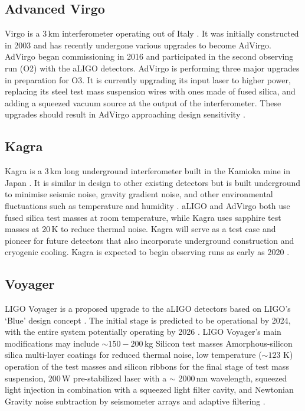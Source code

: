 \documentclass[letterpaper, aps, prd, twocolumn, superscriptaddress, showpacs, nofootinbib]{revtex4}
\begin{document}
\subsection{Advanced Virgo}

Virgo is a 3\,km interferometer operating out of Italy \cite{AdVirgo}. It was initially constructed in 2003 and has recently undergone various upgrades to become AdVirgo. AdVirgo began commissioning in 2016 and participated in the second observing run (O2) with the aLIGO detectors. AdVirgo is performing three major upgrades in preparation for O3. It is currently upgrading its input laser to higher power, replacing its steel test mass suspension wires with ones made of fused silica, and adding a squeezed vacuum source at the output of the interferometer. These upgrades should result in AdVirgo approaching design sensitivity \cite{AdVirgo, whitepaper2018}.

\subsection{Kagra}

Kagra is a 3\,km long underground interferometer built in the Kamioka mine in Japan \cite{2013PhRvD..88d3007A, akutsu2018kagra}. It is similar in design to other existing detectors but is built underground to minimise seismic noise, gravity gradient noise, and other environmental fluctuations such as temperature and humidity \cite{Somiya2012detector}. aLIGO and AdVirgo both use fused silica test masses at room temperature, while Kagra uses sapphire test masses at 20\,K to reduce thermal noise. Kagra will serve as a test case and pioneer for future detectors that also incorporate underground construction and cryogenic cooling. Kagra is expected to begin observing runs as early as 2020 \cite{2013PhRvD..88d3007A, Somiya2012detector, aso2013interferometer}.

\subsection{Voyager}

LIGO Voyager is a proposed upgrade to the aLIGO detectors based on LIGO's `Blue' design concept \cite{voyagerupgrade}. The initial stage is predicted to be operational by 2024, with the entire system potentially operating by 2026 \cite{whitepaper2018}. LIGO Voyager's main modifications may include $\sim 150 - 200$\,kg Silicon test masses Amorphous-silicon silica multi-layer coatings for reduced thermal noise, low temperature ($\sim 123$ K) operation of the test masses and silicon ribbons for the final stage of test mass suspension, 200\,W pre-stabilized laser with a $\sim$ 2000\,nm wavelength, squeezed light injection in combination with a squeezed light filter cavity, and Newtonian Gravity noise subtraction by seismometer arrays and adaptive filtering \cite{2015PhRvD..91h2001D, whitepaper2018}.
\end{document}
